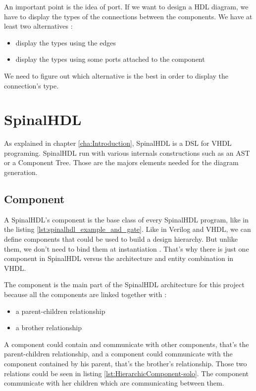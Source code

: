 An important point is the idea of port. If we want to design a HDL diagram, we
have to display the types of the connections between the components. We have at
least two alternatives :
\begin{itemize}
 \item display the types using the edges
 \item display the types using some ports attached to the component
\end{itemize}

We need to figure out which alternative is the best in order to display the
connection's type.

\section{SpinalHDL}
\label{sec:SpinalHDL}

As explained in chapter \ref{cha:Introduction}, SpinalHDL is a DSL for VHDL
programing. SpinalHDL run with various internals constructions such as an AST or
a Component Tree. Those are the majors elements needed for the diagram generation.

\subsection{Component}
\label{sub:Component}

A SpinalHDL's component is the base class of every SpinalHDL program, like in
the listing \ref{lst:spinalhdl_example_and_gate}. Like in Verilog and VHDL, we
can define components that could be used to build a design hierarchy. But unlike
them, we don’t need to bind them at instantiation \cite{github-spinalhdl}.
That's why there is just one component in SpinalHDL versus the architecture and entity
combination in VHDL.

The component is the main part of the SpinalHDL architecture for this project
because all the components are linked together with :
\begin{itemize}
    \item a parent-children relationship
    \item a brother relationship
\end{itemize}

A component could contain and communicate with other components, that's the
parent-children relationship, and a component could communicate with the
component contained by his parent, that's the brother's relationship. Those two
relations could be seen in listing \ref{lst:HierarchicComponent-solo}. The
component communicate with her children which are communicating between
them.

